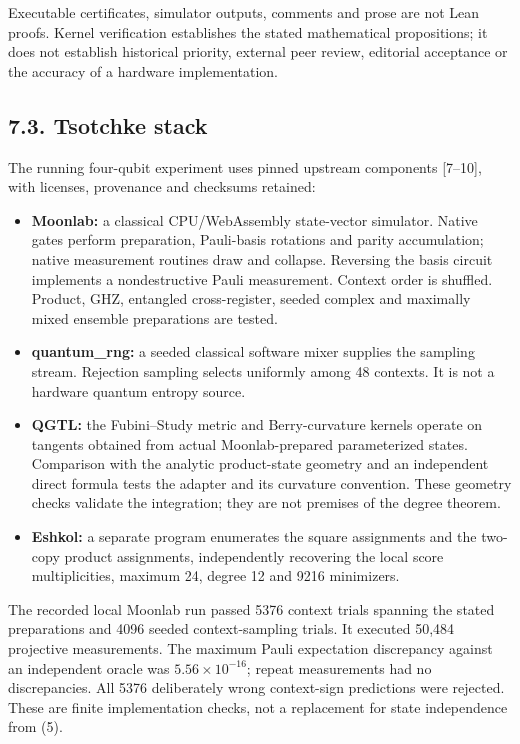 \documentclass[10pt,a4paper]{article}
\providecommand{\tightlist}{\setlength{\itemsep}{0pt}\setlength{\parskip}{0pt}}
\begin{document}
Executable certificates, simulator outputs, comments and prose are not Lean proofs. Kernel verification establishes the stated mathematical propositions; it does not establish historical priority, external peer review, editorial acceptance or the accuracy of a hardware implementation.

\subsection{7.3. Tsotchke stack}\label{tsotchke-stack}

The running four-qubit experiment uses pinned upstream components {[}7--10{]}, with licenses, provenance and checksums retained:

\begin{itemize}
\tightlist
\item
  \textbf{Moonlab:} a classical CPU/WebAssembly state-vector simulator. Native gates perform preparation, Pauli-basis rotations and parity accumulation; native measurement routines draw and collapse. Reversing the basis circuit implements a nondestructive Pauli measurement. Context order is shuffled. Product, GHZ, entangled cross-register, seeded complex and maximally mixed ensemble preparations are tested.
\item
  \textbf{quantum\_rng:} a seeded classical software mixer supplies the sampling stream. Rejection sampling selects uniformly among 48 contexts. It is not a hardware quantum entropy source.
\item
  \textbf{QGTL:} the Fubini--Study metric and Berry-curvature kernels operate on tangents obtained from actual Moonlab-prepared parameterized states. Comparison with the analytic product-state geometry and an independent direct formula tests the adapter and its curvature convention. These geometry checks validate the integration; they are not premises of the degree theorem.
\item
  \textbf{Eshkol:} a separate program enumerates the square assignments and the two-copy product assignments, independently recovering the local score multiplicities, maximum 24, degree 12 and 9216 minimizers.
\end{itemize}

The recorded local Moonlab run passed 5376 context trials spanning the stated preparations and 4096 seeded context-sampling trials. It executed 50,484 projective measurements. The maximum Pauli expectation discrepancy against an independent oracle was \(5.56\times10^{-16}\); repeat measurements had no discrepancies. All 5376 deliberately wrong context-sign predictions were rejected. These are finite implementation checks, not a replacement for state independence from (5).
\end{document}
